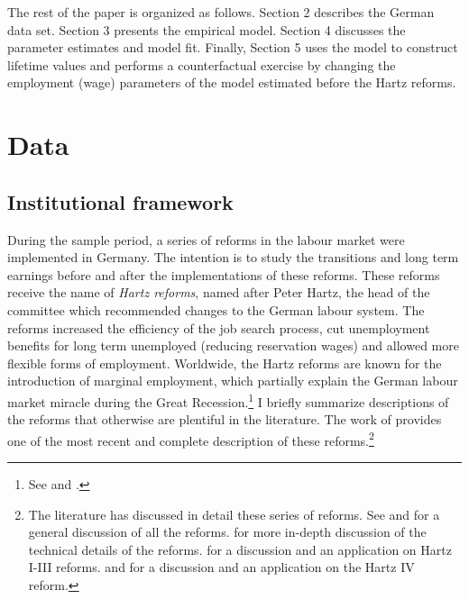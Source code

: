 \documentclass[12pt, a4paper]{article}
\let\Oldsection\section
\renewcommand{\section}{\FloatBarrier\Oldsection}
\let\Oldsubsection\subsection
\renewcommand{\subsection}{\FloatBarrier\Oldsubsection}
\begin{document}
The rest of the paper is organized as follows. Section 2 describes the German data set. Section 3 presents the empirical model. Section 4 discusses the parameter estimates and model fit. Finally, Section 5 uses the model to construct lifetime values and performs a counterfactual exercise by changing the employment (wage) parameters of the model estimated before the Hartz reforms.

\section{Data}\label{Sec:Data}

\subsection{Institutional framework}\label{Sec:inst_framework}

During the sample period, a series of reforms in the labour market were implemented in Germany. The intention is to study the transitions and long term earnings before and after the implementations of these reforms. These reforms receive the name of \emph{Hartz reforms}, named after Peter Hartz, the head of the committee which recommended changes to the German labour system. The reforms increased the efficiency of the job search process, cut unemployment benefits for long term unemployed (reducing reservation wages) and allowed more flexible forms of employment. Worldwide, the Hartz reforms are known for the introduction of marginal employment, which partially explain the German labour market miracle during the Great Recession.\footnote{See \cite{BurdaHunt11} and \cite{DuSpOe14}.} I briefly summarize descriptions of the reforms that otherwise are plentiful in the literature. The work of \cite{CaLaRo18} provides one of the most recent and complete description of these reforms.\footnote{The literature has discussed in detail these series of reforms. See \cite{BurdaHunt11} and \cite{EngbomDetragiacheRaei15} for a general discussion of all the reforms. \cite{Fichtl15} for more in-depth discussion of the technical details of the reforms. \cite{Caliendo2016} for a discussion and an application on Hartz I-III reforms. \cite{LiSchWie16} and \cite{Price16} for a discussion and an application on the Hartz IV reform.}
\end{document}

